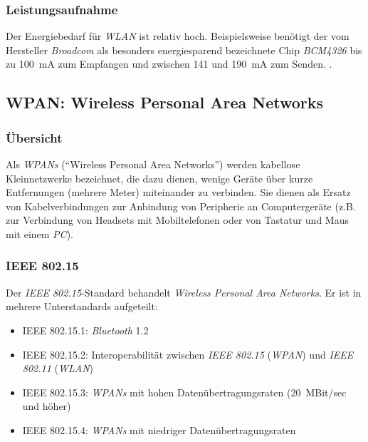         \subsubsection{Leistungsaufnahme}
            Der Energiebedarf für \emph{WLAN} ist relativ hoch. Beispielsweise benötigt der
            vom Hersteller \emph{Broadcom} als besonders energiesparend bezeichnete Chip
            \emph{BCM4326} bis zu 100~mA zum Empfangen und zwischen 141 und 190~mA zum Senden.
            \cite{BCM4326_Datasheet}. 

    \subsection{WPAN: Wireless Personal Area Networks}
        \subsubsection{Übersicht}
            Als \emph{WPANs} ("`Wireless Personal Area Networks"') werden kabellose Kleinnetzwerke bezeichnet, die dazu 
            dienen, wenige Geräte über kurze Entfernungen (mehrere Meter) miteinander zu verbinden. Sie dienen als Ersatz 
            von Kabelverbindungen zur Anbindung von Peripherie an Computergeräte (z.B. zur Verbindung von
            Headsets mit Mobiltelefonen oder von Tastatur und Maus mit einem \emph{PC}).
            

        \subsubsection{IEEE 802.15}
            Der \emph{IEEE 802.15}-Standard behandelt \textsl{Wireless Personal Area Networks}. Er ist in mehrere 
            Unterstandards aufgeteilt:

             \begin{itemize}
                \item{IEEE 802.15.1:} \emph{Bluetooth} 1.2
                \item{IEEE 802.15.2:} Interoperabilität zwischen \emph{IEEE 802.15} (\emph{WPAN}) 
                                      und \emph{IEEE 802.11} (\emph{WLAN})
                \item{IEEE 802.15.3:} \emph{WPANs} mit hohen Datenübertragungsraten (20~MBit/sec und höher)
                \item{IEEE 802.15.4:} \emph{WPANs} mit niedriger Datenübertragungsraten
            \end{itemize}

